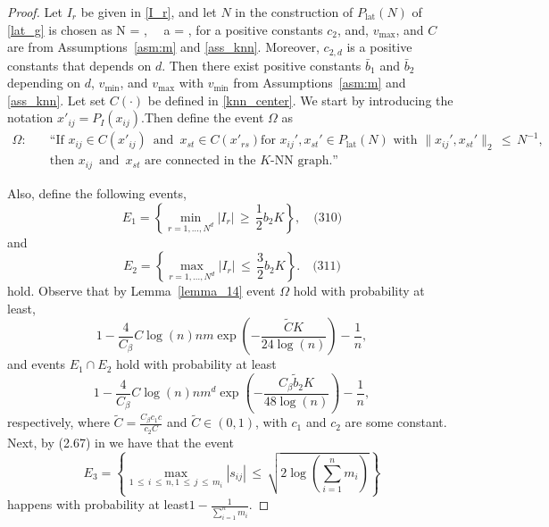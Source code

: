 \documentclass[twoside,11pt]{article}
\begin{document}
\begin{proof}
Let $I_r$ be given in \eqref{I_r}, 
and let $N$ in the construction
of $P_\text{lat}(N)$ of \eqref{lat_g} is chosen as  
\bea  
N = , \quad \,\,\,\,\,\,\quad  a = ,
\bea 
for a positive constants \( c_2 \), and, \( v_{\max} \), and \( C \) are from Assumptions~\ref{asm:m} and \ref{ass_knn}. Moreover, \( c_{2,d} \) is a positive constants that depends on \( d \). Then there exist positive constants \( \bar{b}_1 \) and \( \bar{b}_2 \) depending on \( d \), \( v_{\min} \), and \( v_{\max} \) with \( v_{\min} \) from Assumptions~\ref{asm:m} and \ref{ass_knn}. Let set $C(\cdot)$ be defined in \eqref{knn_center}. We start by introducing the notation ${x'}_{ij} = P_I(x_{ij})$.Then
define the event \(\Omega\)  as
\begin{equation}
\begin{aligned}
\label{def_omega}
\Omega: \quad & \text{``If } x_{ij} \in C(x'_{ij}) \,\,\,\text{and}\,\,\, x_{st} \in C(x'_{rs}) \text{for } x_{ij}', x_{st}' \in P_{\text{lat}}(N) \text{ with } \|x_{ij}', x_{st}'\|_2 \,\leq\, N^{-1}, \\
        & \text{then } x_{ij} \,\,\,\text{and}\,\,\, x_{st} \text{ are connected in the } K\text{-NN graph.''}
\end{aligned}
\end{equation}



Also, define the following events, 
\[
E_1 = \left\{ \min_{r=1,\ldots,N^d} |I_r| \,\geq\, \frac{1}{2} b_2 K \right\}, \quad \text{(310)}
\]
and
\[
E_2 = \left\{ \max_{r=1,\ldots,N^d} |I_r| \,\leq\, \frac{3}{2} b_2 K \right\}. \quad \text{(311)}
\]
hold. Observe that by Lemma~\ref{lemma_14} event $\Omega$ hold with probability at least,
\[
1 - \frac{4}{C_{\beta}}C\log(n)nm\exp\left(-\frac{\tilde C K }{24\log(n)}\right) - \frac{1}{n},
\]
and events $E_1 \cap E_2$ hold with probability at least
\[
1 - \frac{4}{C_{\beta}}C\log(n)nm^d\exp\left(-\frac{C_{\beta} {\tilde b}_2 K}{48\log(n)}\right) - \frac{1}{n},
\]
respectively, where $\tilde C = \frac{C_{\beta}c_1c}{c_2C}$ and $\tilde C \in (0,1)$, with $c_1$ and $c_2$ are some constant.  Next, by (2.67) in \cite{wainwright2019high} we have that the event
\[
E_3 = \left\{ \max_{1 \,\leq\, i \,\leq\, n, 1\,\leq\, j\,\leq\, m_i} |s_{ij}| \,\leq\,   \sqrt{2 \log\left(\sum_{i = 1}^n   m_i\right)} \right\}
\]
happens with probability at least\(1 - \frac{1}{\sum_{i = 1}^n   m_i}\). 



\end{proof}
\end{document}
